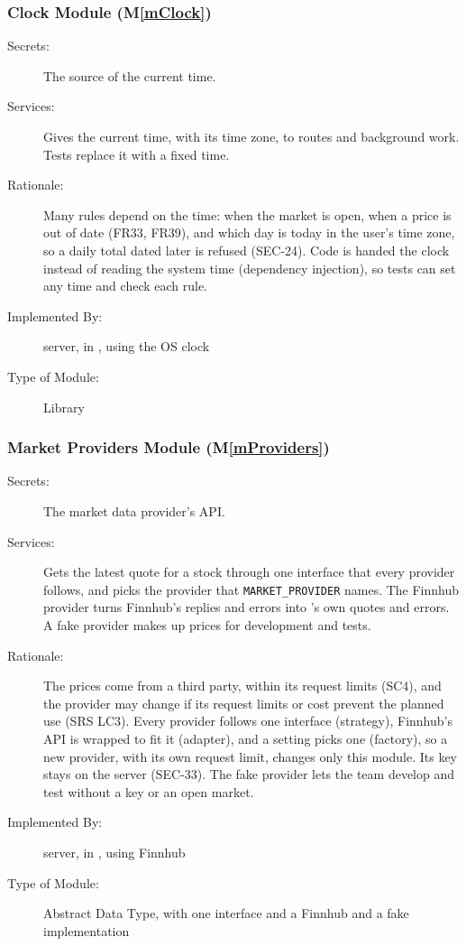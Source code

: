 \documentclass[12pt, titlepage]{article}
\newcommand{\mref}[1]{M\ref{#1}}
\begin{document}
\subsubsection{Clock Module (\mref{mClock})}

\begin{description}
\item[Secrets:] The source of the current time.
\item[Services:] Gives the current time, with its time zone, to routes and background work. Tests replace it with a fixed time.
\item[Rationale:] Many rules depend on the time: when the market is open, when a price is out of date (FR33, FR39), and which day is today in the user's time zone, so a daily total dated later is refused (SEC-24). Code is handed the clock instead of reading the system time (dependency injection), so tests can set any time and check each rule.
\item[Implemented By:] \progname{} server, in , using the OS clock
\item[Type of Module:] Library
\end{description}

\subsubsection{Market Providers Module (\mref{mProviders})}

\begin{description}
\item[Secrets:] The market data provider's API.
\item[Services:] Gets the latest quote for a stock through one interface that every provider follows, and picks the provider that \texttt{MARKET\_PROVIDER} names. The Finnhub provider turns Finnhub's replies and errors into \progname{}'s own quotes and errors. A fake provider makes up prices for development and tests.
\item[Rationale:] The prices come from a third party, within its request limits (SC4), and the provider may change if its request limits or cost prevent the planned use (SRS LC3). Every provider follows one interface (strategy), Finnhub's API is wrapped to fit it (adapter), and a setting picks one (factory), so a new provider, with its own request limit, changes only this module. Its key stays on the server (SEC-33). The fake provider lets the team develop and test without a key or an open market.
\item[Implemented By:] \progname{} server, in , using Finnhub
\item[Type of Module:] Abstract Data Type, with one interface and a Finnhub and a fake implementation
\end{description}
\end{document}
